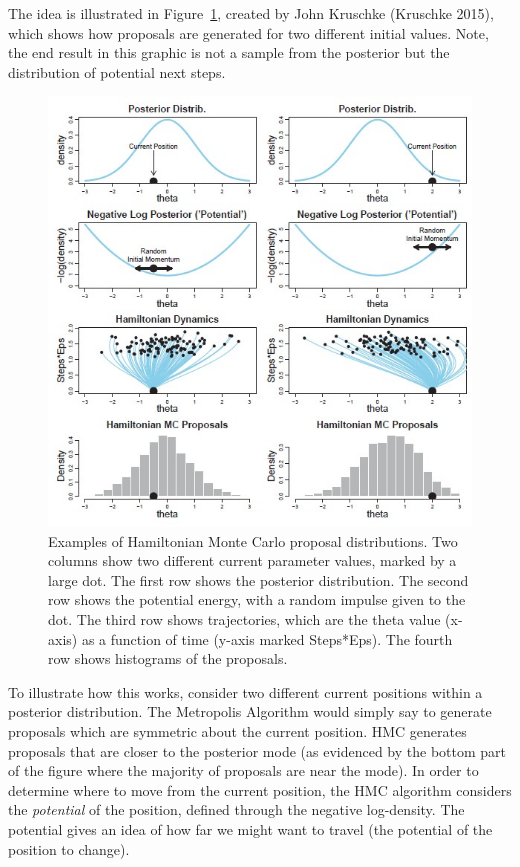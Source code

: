 \documentclass[
  letterpaper,
  DIV=11,
  numbers=noendperiod]{scrreprt}
\theoremstyle{definition}
\theoremstyle{plain}
\theoremstyle{definition}
\theoremstyle{remark}
\begin{document}
The idea is illustrated in Figure~\ref{fig-mcmc-p1}, created by John
Kruschke (Kruschke 2015), which shows how proposals are generated for
two different initial values. Note, the end result in this graphic is
not a sample from the posterior but the distribution of potential next
steps.

\begin{figure}

{\centering \includegraphics{images/Kruschke-Fig1.jpg}

}

\caption{\label{fig-mcmc-p1}Examples of Hamiltonian Monte Carlo proposal
distributions. Two columns show two different current parameter values,
marked by a large dot. The first row shows the posterior distribution.
The second row shows the potential energy, with a random impulse given
to the dot. The third row shows trajectories, which are the theta value
(x-axis) as a function of time (y-axis marked Steps*Eps). The fourth row
shows histograms of the proposals.}

\end{figure}

To illustrate how this works, consider two different current positions
within a posterior distribution. The Metropolis Algorithm would simply
say to generate proposals which are symmetric about the current
position. HMC generates proposals that are closer to the posterior mode
(as evidenced by the bottom part of the figure where the majority of
proposals are near the mode). In order to determine where to move from
the current position, the HMC algorithm considers the \emph{potential}
of the position, defined through the negative log-density. The potential
gives an idea of how far we might want to travel (the potential of the
position to change).
\end{document}
